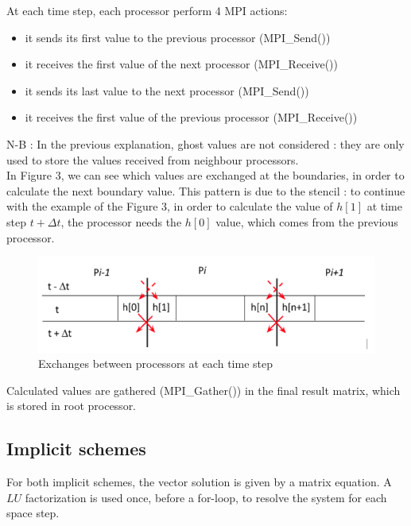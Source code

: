 \documentclass{article}
\begin{document}
            At each time step, each processor perform 4 MPI actions:
            \begin{itemize}
                \item{it sends its first value to the previous processor (MPI\_Send()) }
                \item{it receives the first value of the next processor (MPI\_Receive())}
                \item{it sends its last value to the next processor (MPI\_Send())}
                \item{it receives the first value of the previous processor (MPI\_Receive())}
            \end{itemize}
            N-B : In the previous explanation, ghost values are not considered : they are only used
            to store the values received from neighbour processors.\\
            In Figure 3, we can see which values are exchanged at the boundaries, in order to
            calculate the next boundary value. This pattern is due to the stencil : to continue
            with the example of the Figure 3, in order to calculate the value of $h[1]$ at time step
            $t+\Delta{t}$, the processor needs the $h[0]$ value, which comes from the previous processor.
            \begin{figure}[H]
                \includegraphics[width=\textwidth]{parallel_explicit.png}
                \caption{Exchanges between processors at each time step}
            \end{figure}

            Calculated values are gathered (MPI\_Gather()) in the final result matrix, which is stored in root processor.

    
            \subsection{Implicit schemes}
    
                    For both implicit schemes, the vector solution is given by a matrix equation. A $LU$
                    factorization is used once, before a for-loop, to resolve the system for each space step.
    
\end{document}
